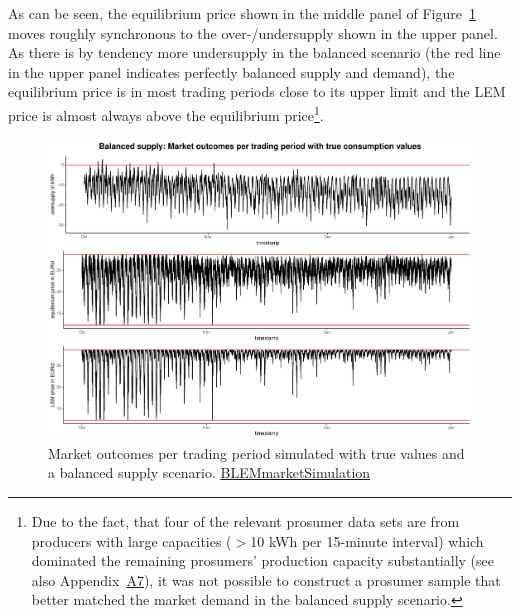 As can be seen, the equilibrium price shown in the middle panel of Figure~\ref{Fig:marketoutcomes_true_balanced} moves roughly synchronous to the over-/undersupply shown in the upper panel. As there is by tendency more undersupply in the balanced scenario (the red line in the upper panel indicates perfectly balanced supply and demand), the equilibrium price is in most trading periods close to its upper limit and the LEM price is almost always above the equilibrium price\footnote{Due to the fact, that four of the relevant prosumer data sets are from producers with large capacities ($>$10 kWh per 15-minute interval) which dominated the remaining prosumers' production capacity substantially (see also Appendix~\hyperlink{AppA7:Figures:producer_all}{A7}), it was not possible to construct a prosumer sample that better matched the market demand in the balanced supply scenario.}.
%
\begin{figure}[htbp]
    \centering
    \includegraphics[width=\textwidth]{thesis/graphs/marketsimulation/marketoutcome_true_balanced.pdf}
    \caption[Market outcomes simulated with balanced supply and true values]{Market outcomes per trading period simulated with true values and a balanced supply scenario. \quantnet\href{https://github.com/QuantLet/BLEM/tree/master/BLEMmarketSimulation}{BLEMmarketSimulation}}
    \label{Fig:marketoutcomes_true_balanced}
\end{figure}
%

